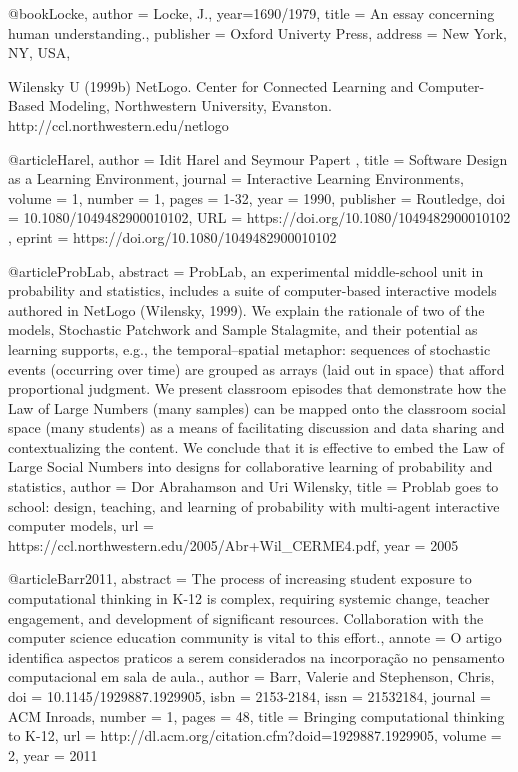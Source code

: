 @book{Locke,
	author = {Locke, J.},
	year={1690/1979},
	title = {An essay concerning human understanding.},
	publisher = {Oxford Univerty Press},
	address = {New York, NY, USA},
}

Wilensky U (1999b) NetLogo. Center for Connected Learning and Computer-Based Modeling, Northwestern University, Evanston. http://ccl.northwestern.edu/netlogo

@article{Harel,
	author = { Idit   Harel  and  Seymour   Papert },
	title = {Software Design as a Learning Environment},
	journal = {Interactive Learning Environments},
	volume = {1},
	number = {1},
	pages = {1-32},
	year  = {1990},
	publisher = {Routledge},
	doi = {10.1080/1049482900010102},
	URL = { 
		https://doi.org/10.1080/1049482900010102
	},
	eprint = { 
		https://doi.org/10.1080/1049482900010102
	}
}

@article{ProbLab,
abstract = {ProbLab, an experimental middle-school unit in probability and statistics, includes a
suite of computer-based interactive models authored in NetLogo (Wilensky, 1999). We
explain the rationale of two of the models, Stochastic Patchwork and Sample Stalagmite,
and their potential as learning supports, e.g., the temporal–spatial metaphor: sequences
of stochastic events (occurring over time) are grouped as arrays (laid out in space) that
afford proportional judgment. We present classroom episodes that demonstrate how the
Law of Large Numbers (many samples) can be mapped onto the classroom social space
(many students) as a means of facilitating discussion and data sharing and
contextualizing the content. We conclude that it is effective to embed the Law of Large
Social Numbers into designs for collaborative learning of probability and statistics},
author = {Dor Abrahamson and Uri Wilensky},
title = {{ Problab goes to school: design, teaching, and
learning of probability with multi-agent
interactive computer models}},
url = {https://ccl.northwestern.edu/2005/Abr+Wil_CERME4.pdf},
year = {2005}
}

@article{Barr2011,
abstract = {The process of increasing student exposure to computational thinking in K-12 is complex, requiring systemic change, teacher engagement, and development of significant resources. Collaboration with the computer science education community is vital to this effort.},
annote = {O artigo identifica aspectos praticos a serem considerados na incorpora{\c{c}}{\~{a}}o no pensamento computacional em sala de aula.},
author = {Barr, Valerie and Stephenson, Chris},
doi = {10.1145/1929887.1929905},
isbn = {2153-2184},
issn = {21532184},
journal = {ACM Inroads},
number = {1},
pages = {48},
title = {{Bringing computational thinking to K-12}},
url = {http://dl.acm.org/citation.cfm?doid=1929887.1929905},
volume = {2},
year = {2011}
}

